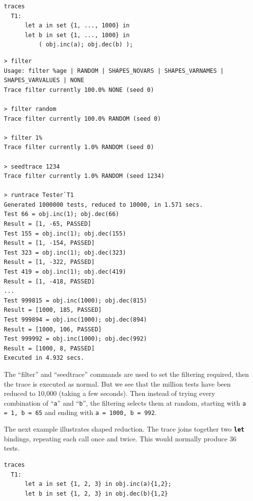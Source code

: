 \documentclass{overturerepchap}
\begin{document}
\small
\begin{lstlisting}
traces
  T1:
      let a in set {1, ..., 1000} in
      let b in set {1, ..., 1000} in
          ( obj.inc(a); obj.dec(b) );
\end{lstlisting}

\lstset{style=tool,language=}
\scriptsize
\begin{lstlisting}[escapechar=@]
> filter
Usage: filter %age | RANDOM | SHAPES_NOVARS | SHAPES_VARNAMES | SHAPES_VARVALUES | NONE
Trace filter currently 100.0% NONE (seed 0)
 
> filter random
Trace filter currently 100.0% RANDOM (seed 0)

> filter 1%
Trace filter currently 1.0% RANDOM (seed 0)

> seedtrace 1234
Trace filter currently 1.0% RANDOM (seed 1234)

> runtrace Tester`T1
Generated 1000000 tests, reduced to 10000, in 1.571 secs. 
Test 66 = obj.inc(1); obj.dec(66)
Result = [1, -65, PASSED]
Test 155 = obj.inc(1); obj.dec(155)
Result = [1, -154, PASSED]
Test 323 = obj.inc(1); obj.dec(323)
Result = [1, -322, PASSED]
Test 419 = obj.inc(1); obj.dec(419)
Result = [1, -418, PASSED]
...
Test 999815 = obj.inc(1000); obj.dec(815)
Result = [1000, 185, PASSED]
Test 999894 = obj.inc(1000); obj.dec(894)
Result = [1000, 106, PASSED]
Test 999992 = obj.inc(1000); obj.dec(992)
Result = [1000, 8, PASSED]
Executed in 4.932 secs. 
\end{lstlisting}
\lstset{style=mystyle}
\lstset{language=VDM++}
\normalsize

The ``filter'' and ``seedtrace'' commands are used to set the filtering
required, then the trace is executed as normal. But we see that the million
tests have been reduced to 10,000 (taking a few seconds). Then instead of trying
every combination of ``\texttt{a}'' and ``\texttt{b}'', the filtering selects them at random,
starting with \texttt{a = 1, b = 65} and ending with \texttt{a = 1000, b = 992}.

The next example illustrates shaped reduction. The trace joins together two
\texttt{\textbf{let}} bindings, repeating each call once and twice. This would normally
produce 36 tests.

\small
\begin{lstlisting}
traces
  T1:
      let a in set {1, 2, 3} in obj.inc(a){1,2};
      let b in set {1, 2, 3} in obj.dec(b){1,2}
\end{lstlisting}
\end{document}
